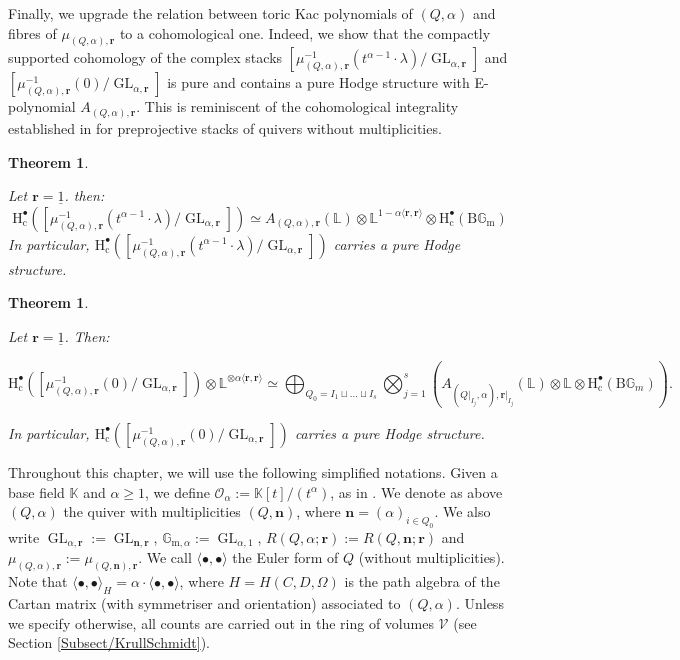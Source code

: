 \documentclass[11pt,english]{article}
\numberwithin{equation}{section}
\numberwithin{figure}{section}
\theoremstyle{definition}
\theoremstyle{plain}
\newtheorem{thm}[df]{Theorem}
\theoremstyle{remark}
\DeclareMathOperator{\GL}{GL}
\newcommand\nn{\mathbf{n}}
\newcommand\rr{\mathbf{r}}
\newcommand\HH{\mathrm{H}}
\newcommand\KK{\mathbb{K}}
\begin{document}
Finally, we upgrade the relation between toric Kac polynomials of
$(Q,\alpha)$ and fibres of $\mu_{(Q,\alpha),\rr}$ to a cohomological
one. Indeed, we show that the compactly supported cohomology of the
complex stacks $\left[\mu_{(Q,\alpha),\rr}^{-1}(t^{\alpha-1}\cdot\lambda)/\GL_{\alpha,\rr}\right]$
and $\left[\mu_{(Q,\alpha),\rr}^{-1}(0)/\GL_{\alpha,\rr}\right]$
is pure and contains a pure Hodge structure with E-polynomial $A_{(Q,\alpha),\rr}$.
This is reminiscent of the cohomological integrality established in
\cite{Dav23c} for preprojective stacks of quivers without multiplicities.

\begin{thm} \label{Thm/Ch4PurityDefToricMomMapFibre}

Let $\rr=\underline{1}$. then:\[
\HH_{\mathrm{c}}^{\bullet}\left(\left[\mu_{(Q,\alpha),\rr}^{-1}(t^{\alpha-1}\cdot\lambda)/\GL_{\alpha,\rr}\right]\right)
\simeq
A_{(Q,\alpha),\rr}(\mathbb{L})\otimes\mathbb{L}^{1-\alpha\langle\rr,\rr\rangle}\otimes\HH_{\mathrm{c}}^{\bullet}\left(\mathrm{B}\mathbb{G}_{\mathrm{m}}\right)
\]In particular, $\HH_{\mathrm{c}}^{\bullet}\left(\left[\mu_{(Q,\alpha),\rr}^{-1}(t^{\alpha-1}\cdot\lambda)/\GL_{\alpha,\rr}\right]\right)$
carries a pure Hodge structure.

\end{thm}

\begin{thm} \label{Thm/Ch4PurityToricPreprojStack}

Let $\rr=\underline{1}$. Then:

\[
\HH_{\mathrm{c}}^{\bullet}\left(\left[\mu_{(Q,\alpha),\rr}^{-1}(0)/\GL_{\alpha,\rr}\right]\right)
\otimes\mathbb{L}^{\otimes\alpha\langle\rr,\rr\rangle}
\simeq
\bigoplus_{Q_0=I_1\sqcup\ldots\sqcup I_s}
\bigotimes_{j=1}^s
\left(
A_{(Q\vert_{I_j},\alpha),\rr\vert_{I_j}}(\mathbb{L})\otimes\mathbb{L}\otimes \HH_{\mathrm{c}}^{\bullet}(\mathrm{B}\mathbb{G}_m)
\right).
\]

In particular, $\HH_{\mathrm{c}}^{\bullet}\left(\left[\mu_{(Q,\alpha),\rr}^{-1}(0)/\GL_{\alpha,\rr}\right]\right)$
carries a pure Hodge structure.

\end{thm}

Throughout this chapter, we will use the following simplified notations.
Given a base field $\KK$ and $\alpha\geq1$, we define $\mathcal{O}_{\alpha}:=\KK[t]/(t^{\alpha})$,
as in \cite{Wys17b}. We denote as above $(Q,\alpha)$ the quiver
with multiplicities $(Q,\nn)$, where $\nn=(\alpha)_{i\in Q_{0}}$.
We also write $\GL_{\alpha,\rr}:=\GL_{\nn,\rr}$, $\mathbb{G}_{\mathrm{m},\alpha}:=\GL_{\alpha,1}$,
$R(Q,\alpha;\rr):=R(Q,\nn;\rr)$ and $\mu_{(Q,\alpha),\rr}:=\mu_{(Q,\nn),\rr}$.
We call $\langle\bullet,\bullet\rangle$ the Euler form of $Q$ (without
multiplicities). Note that $\langle\bullet,\bullet\rangle_{H}=\alpha\cdot\langle\bullet,\bullet\rangle$,
where $H=H(C,D,\Omega)$ is the path algebra of the Cartan matrix
(with symmetriser and orientation) associated to $(Q,\alpha)$. Unless
we specify otherwise, all counts are carried out in the ring of volumes
$\mathcal{V}$ (see Section \ref{Subsect/KrullSchmidt}).
\end{document}
